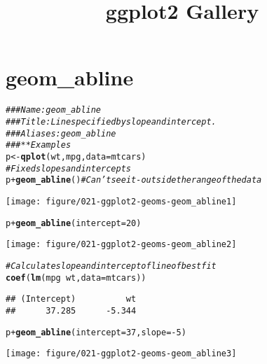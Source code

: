 \documentclass[a4paper,titlepage]{tufte-handout}\usepackage[]{graphicx}\usepackage[]{color}
\title{ggplot2 Gallery}
\makeatletter
\def\maxwidth{ %
  \ifdim\Gin@nat@width>\linewidth
    \linewidth
  \else
    \Gin@nat@width
  \fi
}
\newcommand{\hlnum}[1]{\textcolor[rgb]{0.686,0.059,0.569}{#1}}%
\newcommand{\hlcom}[1]{\textcolor[rgb]{0.678,0.584,0.686}{\textit{#1}}}%
\newcommand{\hlopt}[1]{\textcolor[rgb]{0,0,0}{#1}}%
\newcommand{\hlstd}[1]{\textcolor[rgb]{0.345,0.345,0.345}{#1}}%
\newcommand{\hlkwb}[1]{\textcolor[rgb]{0.69,0.353,0.396}{#1}}%
\newcommand{\hlkwc}[1]{\textcolor[rgb]{0.333,0.667,0.333}{#1}}%
\newcommand{\hlkwd}[1]{\textcolor[rgb]{0.737,0.353,0.396}{\textbf{#1}}}%
\newenvironment{kframe}{%
 \def\at@end@of@kframe{}%
 \ifinner\ifhmode%
  \def\at@end@of@kframe{\end{minipage}}%
  \begin{minipage}{\columnwidth}%
 \fi\fi%
 \def\FrameCommand##1{\hskip\@totalleftmargin \hskip-\fboxsep
 \colorbox{shadecolor}{##1}\hskip-\fboxsep
     \hskip-\linewidth \hskip-\@totalleftmargin \hskip\columnwidth}%
 \MakeFramed {\advance\hsize-\width
   \@totalleftmargin\z@ \linewidth\hsize
   \@setminipage}}%
 {\par\unskip\endMakeFramed%
 \at@end@of@kframe}
\newenvironment{knitrout}{}{} %
\makeatother
\begin{document}
\maketitle
\tableofcontents







\section{geom\_abline}

\begin{knitrout}
\color{fgcolor}\begin{kframe}
\begin{alltt}
\hlcom{### Name: geom_abline}
\hlcom{### Title: Line specified by slope and intercept.}
\hlcom{### Aliases: geom_abline}
\hlcom{### ** Examples}
\hlstd{p} \hlkwb{<-} \hlkwd{qplot}\hlstd{(wt, mpg,} \hlkwc{data} \hlstd{= mtcars)}
\hlcom{# Fixed slopes and intercepts}
\hlstd{p} \hlopt{+} \hlkwd{geom_abline}\hlstd{()} \hlcom{# Can't see it - outside the range of the data}
\end{alltt}
\end{kframe}
\texttt{[image: figure/021-ggplot2-geoms-geom\_abline1]} 
\begin{kframe}\begin{alltt}
\hlstd{p} \hlopt{+} \hlkwd{geom_abline}\hlstd{(}\hlkwc{intercept} \hlstd{=} \hlnum{20}\hlstd{)}
\end{alltt}
\end{kframe}
\texttt{[image: figure/021-ggplot2-geoms-geom\_abline2]} 
\begin{kframe}\begin{alltt}
\hlcom{# Calculate slope and intercept of line of best fit}
\hlkwd{coef}\hlstd{(}\hlkwd{lm}\hlstd{(mpg} \hlopt{~} \hlstd{wt,} \hlkwc{data} \hlstd{= mtcars))}
\end{alltt}
\begin{verbatim}
## (Intercept)          wt 
##      37.285      -5.344
\end{verbatim}
\begin{alltt}
\hlstd{p} \hlopt{+} \hlkwd{geom_abline}\hlstd{(}\hlkwc{intercept} \hlstd{=} \hlnum{37}\hlstd{,} \hlkwc{slope} \hlstd{=} \hlopt{-}\hlnum{5}\hlstd{)}
\end{alltt}
\end{kframe}
\texttt{[image: figure/021-ggplot2-geoms-geom\_abline3]} 

\end{knitrout}
\end{document}
